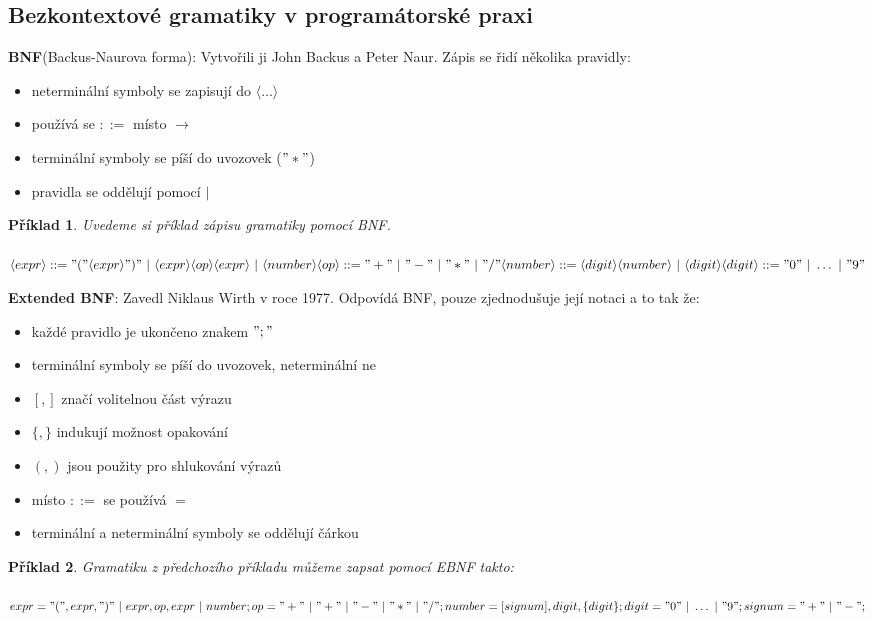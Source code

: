 \documentclass[10pt, a4paper, titlepage]{article}
\theoremstyle{note}
\newtheorem{priklad}{\textbf{Příklad}}
\begin{document}
\subsection{Bezkontextové gramatiky v programátorské praxi}

\textbf{BNF}(Backus-Naurova forma):
Vytvořili ji John Backus a Peter Naur. Zápis se řidí několika pravidly:
\begin{itemize}
\item
neterminální symboly se zapisují do $\langle \ldots \rangle$
\item
používá se $::=$ místo $\rightarrow$
\item
terminální symboly se píší do uvozovek ($"*"$)
\item
pravidla se oddělují pomocí $|$
\end{itemize}

\begin{priklad}
Uvedeme si příklad zápisu gramatiky pomocí BNF. \\
\\
$\langle expr \rangle ::= "(" \langle expr \rangle ")"\ |\ \langle expr \rangle\langle op \rangle\langle expr \rangle\ |\ \langle number \rangle \\
\langle op \rangle ::= "+"\ |\ "-"\ |\ "*"\ |\ "/" \\
\langle number \rangle ::= \langle digit \rangle \langle number \rangle\ |\ \langle digit \rangle \\
\langle digit \rangle ::= "0"\ |\ \ldots\ |\ "9"$
\end{priklad}

\textbf{Extended BNF}: Zavedl Niklaus Wirth v roce 1977. Odpovídá BNF, pouze zjednodušuje její notaci a to tak že:
\begin{itemize}
\item
každé pravidlo je ukončeno znakem $";"$
\item
terminální symboly se píší do uvozovek, neterminální ne
\item
$[,]$ značí volitelnou část výrazu
\item
$\lbrace,\rbrace$ indukují možnost opakování
\item
$(,)$ jsou použity pro shlukování výrazů
\item
místo $::=$ se používá $=$
\item
terminální a neterminální symboly se oddělují čárkou
\end{itemize}

\begin{priklad}
Gramatiku z předchozího příkladu můžeme zapsat pomocí EBNF takto:  \\
\\
$expr="(",expr,")"\ |\ expr,op,expr\ |\ number;\\
op="+"\ |\ "+"\ |\ "-"\ |\ "*"\ |\ "/";\\
number=[signum],digit,\lbrace digit \rbrace;\\
digit="0"\ |\ \ldots \ |\ "9";\\
signum="+"\ |\ "-";$
\end{priklad}
\end{document}
